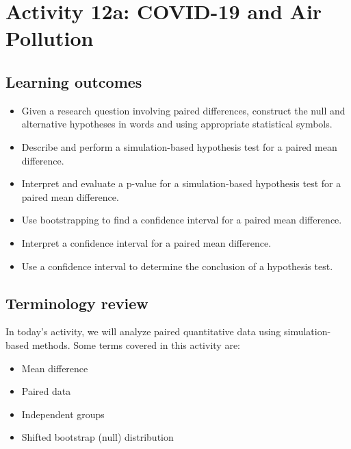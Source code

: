 \documentclass[
]{report}
\begin{document}
\newpage

\hypertarget{activity-12a-covid-19-and-air-pollution}{%
\section{Activity 12a: COVID-19 and Air Pollution}\label{activity-12a-covid-19-and-air-pollution}}


\hypertarget{learning-outcomes-6}{%
\subsection{Learning outcomes}\label{learning-outcomes-6}}

\begin{itemize}
\item
  Given a research question involving paired differences, construct the null and alternative hypotheses
  in words and using appropriate statistical symbols.
\item
  Describe and perform a simulation-based hypothesis test for a paired mean difference.
\item
  Interpret and evaluate a p-value for a simulation-based hypothesis test for a paired mean difference.
\item
  Use bootstrapping to find a confidence interval for a paired mean difference.
\item
  Interpret a confidence interval for a paired mean difference.
\item
  Use a confidence interval to determine the conclusion of a hypothesis test.
\end{itemize}

\hypertarget{terminology-review-19}{%
\subsection{Terminology review}\label{terminology-review-19}}

In today's activity, we will analyze paired quantitative data using simulation-based methods. Some terms covered in this activity are:

\begin{itemize}
\item
  Mean difference
\item
  Paired data
\item
  Independent groups
\item
  Shifted bootstrap (null) distribution
\end{itemize}
\end{document}
